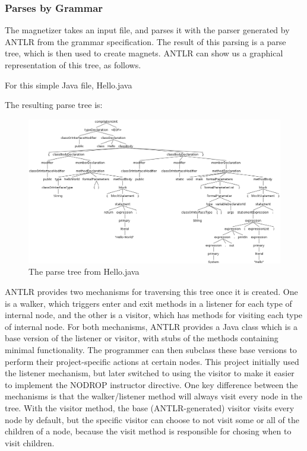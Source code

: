 \documentclass[letter,10pt]{article}
\begin{document}
\subsubsection{Parses by Grammar}

The magnetizer takes an input file, and parses it with the parser 
generated by ANTLR from the grammar specification. The result of this 
parsing is a parse tree, which is then used to create magnets. ANTLR 
can show us a graphical representation of this tree, as follows.

For this simple Java file, Hello.java


The resulting parse tree is:

\begin{figure}
 \centering
 \includegraphics[width=\linewidth]{./images/hello_parse_tree.png}
 \caption{The parse tree from Hello.java}
 \label{fig:hello_parse_tree}
\end{figure}

ANTLR provides two mechanisms for traversing this tree once it is 
created. One is a walker, which triggers enter and exit methods in a 
listener for each type of internal node, and the other is a visitor, 
which has methods for visiting each type of internal node. For 
both mechanisms, ANTLR provides a Java class which is a base version of 
the listener or visitor, with stubs of the methods containing minimal 
functionality. The programmer can then subclass these base 
versions to perform their project-specific actions at certain nodes. 
This project initially used the listener mechanism, but later switched 
to using the visitor to make it easier to implement the NODROP 
instructor directive. One key difference between the mechanisms is that 
the walker/listener method will always visit every node in the tree. 
With the visitor method, the base (ANTLR-generated) visitor visits 
every node by default, but the specific visitor can choose to not visit 
some or all of the children of a node, because the visit method is 
responsible for chosing when to visit children.
\end{document}
